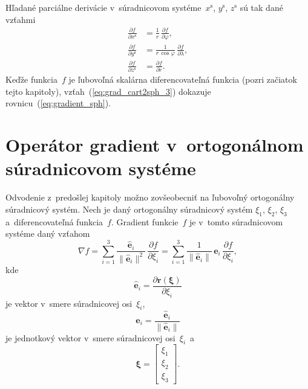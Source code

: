\documentclass[a4paper,12pt]{book}
\let\vec\mathbf
\begin{document}
%
Hľadané parciálne derivácie v~súradnicovom systéme~$x^\mathrm{s}$, 
$y^\mathrm{s}$, $z^\mathrm{s}$ sú tak dané vzťahmi
%
\begin{equation}
\label{eq:lnof_diff_oeprators}
\begin{split}
\frac{\partial f}{\partial x^\mathrm{s}} &= \frac{1}{r} \, \frac{\partial 
f}{\partial \varphi}{,}\\
%
\frac{\partial f}{\partial y^\mathrm{s}} &= \frac{1}{r \, \cos\varphi} \, 
\frac{\partial f}{\partial \lambda}{,}\\
%
\frac{\partial f}{\partial z^\mathrm{s}} &= \frac{\partial f}{\partial r}{.}
\end{split}
\end{equation}
%
Keďže funkcia~$f$ je ľubovoľná skalárna diferencovateľná funkcia (pozri 
začiatok tejto kapitoly), vzťah~(\ref{eq:grad_cart2sph_3}) dokazuje 
rovnicu~(\ref{eq:gradient_sph}).




\section{Operátor gradient v~ortogonálnom súradnicovom systéme}
\label{app:gradient_in_orthogonal_coordinates}

Odvodenie z~predošlej kapitoly možno zovšeobecniť na ľubovoľný ortogonálny 
súradnicový systém.  Nech je daný ortogonálny súradnicový systém $\xi_1$, 
$\xi_2$, $\xi_3$ a~diferencovateľná funkcia~$f$.  Gradient funkcie~$f$ je 
v~tomto súradnicovom systéme daný vzťahom 
\parencite{Arfken2005,SansoGeoidDetermination}
%
\begin{equation}
\label{eq:grad_orthogonal_system}
\nabla f = \sum_{i = 1}^3 \frac{\hat{\vec e}_i}{\| \hat{\vec e}_i \|^2} \, 
\frac{\partial f}{\partial \xi_i} = \sum_{i = 1}^3 \frac{1}{\| \hat{\vec e}_i 
\|} \, \vec e_i \, \frac{\partial f}{\partial \xi_i}{,}
\end{equation}
%
kde
%
\begin{equation}
\label{eq:xi1xi2xi3_vectors}
\hat{\vec e}_i = \frac{\partial \vec r(\boldsymbol \xi)}{\partial \xi_i}
\end{equation}
%
je vektor v~smere súradnicovej osi~$\xi_i$,
%
\begin{equation}
\label{eq:xi1xi2xi3_unit_vectors}
\vec e_i = \frac{\hat{\vec e}_i}{\| \hat{\vec e}_i \|}
\end{equation}
%
je jednotkový vektor v~smere súradnicovej osi~$\xi_i$~a
%
\begin{equation}
\boldsymbol \xi =
%
\begin{bmatrix}
\xi_1\\
\xi_2\\
\xi_3
\end{bmatrix}
%
{.}
%
\end{equation}
\end{document}
